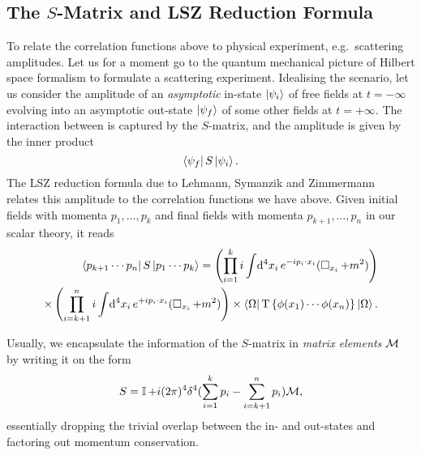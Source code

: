 \documentclass[../main.tex]{subfiles}
\begin{document}
\subsection{The \(S\)-Matrix and LSZ Reduction Formula}
To relate the correlation functions above to physical experiment, e.g.\ scattering amplitudes.
Let us for a moment go to the quantum mechanical picture of Hilbert space formalism to formulate a scattering experiment.
Idealising the scenario, let us consider the amplitude of an \emph{asymptotic} in-state \(\left| \psi_i \right\rangle\) of free fields at \(t=-\infty\) evolving into an asymptotic out-state \(\left| \psi_f \right\rangle\) of some other fields at \(t=+\infty\).
The interaction between is captured by the \(S\)-matrix, and the amplitude is given by the inner product
\begin{equation}
  \left\langle \psi_f \right| S \left| \psi_i \right\rangle.
\end{equation}
The LSZ reduction formula due to Lehmann, Symanzik and Zimmermann~\cite{LSZ} relates this amplitude to the correlation functions we have above.
Given initial fields with momenta \(p_1, \ldots, p_k\) and final fields with momenta \(p_{k+1}, \ldots, p_n\) in our scalar theory, it reads~\cite{Schwartz:2014sze}
\begin{align}
  \label{qft:eq:S-matrix}
  \nonumber
  \left\langle p_{k+1}\cdots p_n \right| S \left| p_1 \cdots p_k \right\rangle = \left(\prod_{i=1}^k i \int \!\mathrm{d}^4x_i\, e^{-ip_i \cdot x_i} (\operatorname{\Box}_{x_i} + m^2)\right) \\
  \times \left(\prod_{i=k+1}^n i \int \!\mathrm{d}^4x_i\, e^{+ip_i \cdot x_i} (\operatorname{\Box}_{x_i} + m^2)\right)
  \times \left\langle \Omega \right| \operatorname{T}\left\{\phi(x_1)\cdots \phi(x_n)\right\} \left| \Omega \right\rangle.
\end{align}

Usually, we encapsulate the information of the \(S\)-matrix in \emph{matrix elements} \(\mathcal{M}\) by writing it on the form
\begin{equation}
  S = \operatorname{\mathbb{I}} + i(2\pi)^4 \delta^4(\sum_{i=1}^k p_i - \sum_{i=k+1}^n p_i) \mathcal{M},
\end{equation}
essentially dropping the trivial overlap between the in- and out-states and factoring out momentum conservation.
\medskip
\end{document}
